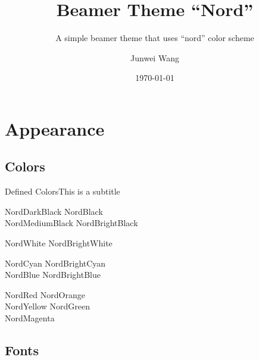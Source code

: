 \documentclass[compress]{beamer}
\title{Beamer Theme ``Nord''}
\subtitle{A simple beamer theme that uses ``nord'' color scheme}
\author{Junwei Wang}
\institute{CryptoExperts}
\date{\today}
\begin{document}
\begin{frame}
  \maketitle
\end{frame}


\section{Appearance}

\subsection{Colors}

\begin{frame}{Defined Colors}{This is a subtitle}
  \begin{description}
  \item[Polar Night]
    \textcolor{NordDarkBlack}{NordDarkBlack} \quad \textcolor{NordBlack}{NordBlack}\\
    \textcolor{NordMediumBlack}{NordMediumBlack} \quad \textcolor{NordBrightBlack}{NordBrightBlack}
  \item[Snow Storm]
    \textcolor{NordWhite}{NordWhite} \quad \textcolor{NordBrightWhite}{NordBrightWhite}
  \item[Forest]
    \textcolor{NordCyan}{NordCyan} \quad \textcolor{NordBrightCyan}{NordBrightCyan}\\
    \textcolor{NordBlue}{NordBlue} \quad \textcolor{NordBrightBlue}{NordBrightBlue}
  \item[Aurora]
    \textcolor{NordRed}{NordRed} \quad \textcolor{NordOrange}{NordOrange} \\
    \textcolor{NordYellow}{NordYellow} \quad \textcolor{NordGreen}{NordGreen} \\
    \textcolor{NordMagenta}{NordMagenta}
  \end{description}
\end{frame}

\subsection{Fonts}
\end{document}

